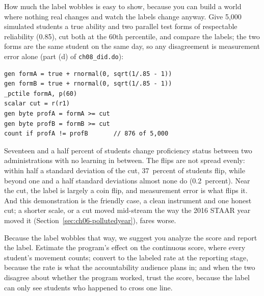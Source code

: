 How much the label wobbles is easy to show, because you can build a world where nothing real changes and watch the labels change anyway. Give 5{,}000 simulated students a true ability and two parallel test forms of respectable reliability (0.85), cut both at the 60th percentile, and compare the labels; the two forms are the same student on the same day, so any disagreement is measurement error alone (part (d) of \texttt{ch08\_did.do}):
\par
{\footnotesize
\begin{verbatim}
gen formA = true + rnormal(0, sqrt(1/.85 - 1))
gen formB = true + rnormal(0, sqrt(1/.85 - 1))
_pctile formA, p(60)
scalar cut = r(r1)
gen byte profA = formA >= cut
gen byte profB = formB >= cut
count if profA != profB       // 876 of 5,000
\end{verbatim}
}
Seventeen and a half percent of students change proficiency status between two administrations with no learning in between. The flips are not spread evenly: within half a standard deviation of the cut, 37~percent of students flip, while beyond one and a half standard deviations almost none do (0.2~percent). Near the cut, the label is largely a coin flip, and measurement error is what flips it. And this demonstration is the friendly case, a clean instrument and one honest cut; a shorter scale, or a cut moved mid-stream the way the 2016 STAAR year moved it (Section~\ref{sec:ch06-pollutedyear}), fares worse.

Because the label wobbles that way, we suggest you analyze the score and report the label. Estimate the program's effect on the continuous score, where every student's movement counts; convert to the labeled rate at the reporting stage, because the rate is what the accountability audience plans in; and when the two disagree about whether the program worked, trust the score, because the label can only see students who happened to cross one line.

